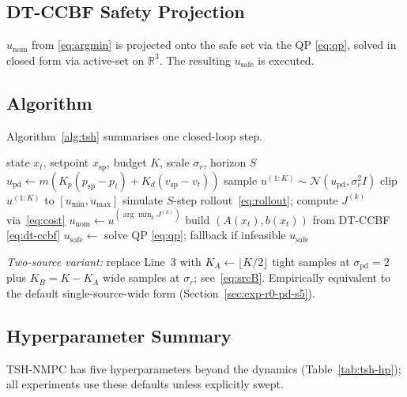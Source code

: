 \documentclass[11pt,onecolumn,a4paper]{article}
\newcommand{\R}{\mathbb{R}}
\newcommand{\spt}{\mathrm{sp}}
\newcommand{\pd}{\mathrm{pd}}
\newcommand{\nom}{\mathrm{nom}}
\newcommand{\safe}{\mathrm{safe}}
\begin{document}
\subsection{DT-CCBF Safety Projection}

$u_\nom$ from \eqref{eq:argmin} is projected onto the safe set via
the QP \eqref{eq:qp}, solved in closed form via active-set on $\R^3$.
The resulting $u_\safe$ is executed.

\subsection{Algorithm}

Algorithm~\ref{alg:tsh} summarises one closed-loop step.

\begin{algorithm}[t]
\caption{TSH-NMPC: one closed-loop step at state $x_t$}\label{alg:tsh}
\begin{algorithmic}[1]
\Require state $x_t$, setpoint $x_\spt$, budget $K$, scale
$\sigma_r$, horizon $S$
\State $u_\pd \gets m (K_p(p_\spt - p_t) + K_d(v_\spt - v_t))$
\State sample $u^{(1{:}K)} \sim \mathcal{N}(u_\pd, \sigma_r^2 I)$
\State clip $u^{(1{:}K)}$ to $[u_{\min}, u_{\max}]$
  \State simulate $S$-step rollout~\eqref{eq:rollout}; compute
  $J^{(k)}$ via~\eqref{eq:cost}
\EndFor
\State $u_\nom \gets u^{(\arg\min_k J^{(k)})}$
\State build $(A(x_t), b(x_t))$ from DT-CCBF \eqref{eq:dt-ccbf}
\State $u_\safe \gets$ solve QP \eqref{eq:qp}; fallback if infeasible
\State \Return $u_\safe$
\end{algorithmic}
\end{algorithm}

\noindent\emph{Two-source variant:} replace Line~3 with
$K_A \gets \lfloor K/2\rfloor$ tight samples at $\sigma_\pd = 2$
plus $K_B = K - K_A$ wide samples at $\sigma_r$; see~\eqref{eq:srcB}.
Empirically equivalent to the default single-source-wide form
(Section~\ref{sec:exp-r0-pd-s5}).

\subsection{Hyperparameter Summary}

TSH-NMPC has five hyperparameters beyond the dynamics
(Table~\ref{tab:tsh-hp}); all experiments use these defaults unless
explicitly swept.
\end{document}

